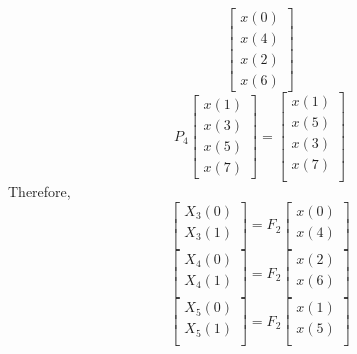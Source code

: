 \documentclass[journal,12pt,twocolumn]{IEEEtran}
\numberwithin{equation}{section}
\renewcommand\thesection{\arabic{section}}
\begin{document}
\begin{enumerate}[label=\arabic*.,ref=\thesection.\theenumi]
\begin{equation}
\begin{bmatrix}
x(0) \\ 
x(4) \\ 
x(2) \\
x(6)
\end{bmatrix}\label{P4_1}
\end{equation}
\begin{equation}
P_{4}
\begin{bmatrix}
x(1) \\ 
x(3) \\ 
x(5) \\
x(7)
\end{bmatrix}
 = 
\begin{bmatrix}
x(1) \\ 
x(5) \\ 
x(3) \\ 
x(7) \\
\end{bmatrix}\label{P4_2}
\end{equation}
Therefore,
\begin{equation}
\begin{bmatrix}
X_{3}(0) \\ 
X_{3}(1)\\ 
\end{bmatrix}
= F_{2}
\begin{bmatrix}
x(0) \\ 
x(4) \\ 
\end{bmatrix}
\end{equation}
\begin{equation}
\begin{bmatrix}
X_{4}(0) \\ 
X_{4}(1)\\ 
\end{bmatrix}
= F_{2}
\begin{bmatrix}
x(2) \\ 
x(6) \\ 
\end{bmatrix}
\end{equation}
\begin{equation}
\begin{bmatrix}
X_{5}(0) \\ 
X_{5}(1)\\ 
\end{bmatrix}
= F_{2}
\begin{bmatrix}
x(1) \\ 
x(5) \\ 
\end{bmatrix}
\end{equation}

\end{enumerate}
\end{document}
